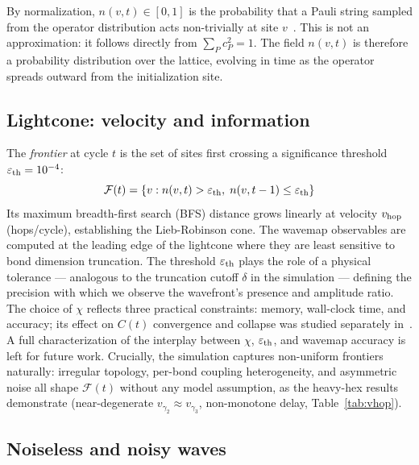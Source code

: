 \documentclass[letterpaper]{article}
\begin{document}
By normalization, $n(v,t) \in [0,1]$ is the probability that a Pauli
string sampled from the operator distribution acts non-trivially at
site $v$~\cite{nahum2018operator,Tan2025Operator}.
This is not an approximation: it follows directly from $\sum_P c_P^2=1$.
The field $n(v,t)$ is therefore a probability distribution over the
lattice, evolving in time as the operator spreads outward from the
initialization site.

\subsection{Lightcone: velocity and information}

The \emph{frontier} at cycle $t$ is the set of sites first crossing a
significance threshold $\varepsilon_{\rm th} = 10^{-4}$:
\begin{equation}
    \mathcal{F}(t) = \{v : n(v,t) > \varepsilon_{\rm th},\;
                          n(v,t-1) \leq \varepsilon_{\rm th}\}
\end{equation}
Its maximum breadth-first search (BFS) distance grows linearly at
velocity $v_{\rm hop}$ (hops/cycle), establishing the Lieb-Robinson
cone.
The wavemap observables are computed at the leading edge of the
lightcone where they are least sensitive to bond dimension truncation.
The threshold $\varepsilon_{\rm th}$ plays the role of a physical
tolerance — analogous to the truncation cutoff $\delta$ in the
simulation — defining the precision with which we observe the
wavefront's presence and amplitude ratio.
The choice of $\chi$ reflects three practical constraints: memory,
wall-clock time, and accuracy; its effect on $C(t)$ convergence
and collapse was studied separately in~\cite{dalberto2026ising}.
A full characterization of the interplay between $\chi$,
$\varepsilon_{\rm th}$, and wavemap accuracy is left for future work.
Crucially, the simulation captures non-uniform frontiers naturally:
irregular topology, per-bond coupling heterogeneity, and asymmetric
noise all shape $\mathcal{F}(t)$ without any model assumption, as
the heavy-hex results demonstrate (near-degenerate $v_{\gamma_2}
\approx v_{\gamma_3}$, non-monotone delay, Table~\ref{tab:vhop}).

\subsection{Noiseless and noisy waves}
\end{document}
